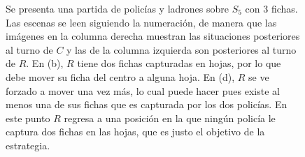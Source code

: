 \begin{figure}[H]
\begin{tcbitemize}
    \end{tcbitemize}
    \captionsetup{font=footnotesize}
    \caption{Se presenta una partida de polic\'ias y ladrones sobre $S_5$ con
    $3$ fichas. Las escenas se leen siguiendo la numeraci\'on, de manera que las
    im\'agenes en la columna derecha muestran las situaciones posteriores al
    turno de $C$ y las de la columna izquierda son posteriores al turno de $R$.
    En (b), $R$ tiene dos fichas capturadas en hojas, por lo que debe mover su
    ficha del centro a alguna hoja. En (d), $R$ se ve forzado a mover una vez
    m\'as, lo cual puede hacer pues existe al menos una de sus fichas que es
    capturada por los dos polic\'ias. En este punto $R$ regresa a una posici\'on
    en la que ning\'un polic\'ia le captura dos fichas en las hojas, que es
    justo el objetivo de la estrategia.}
    \label{fig:gana-R}
\end{figure}

